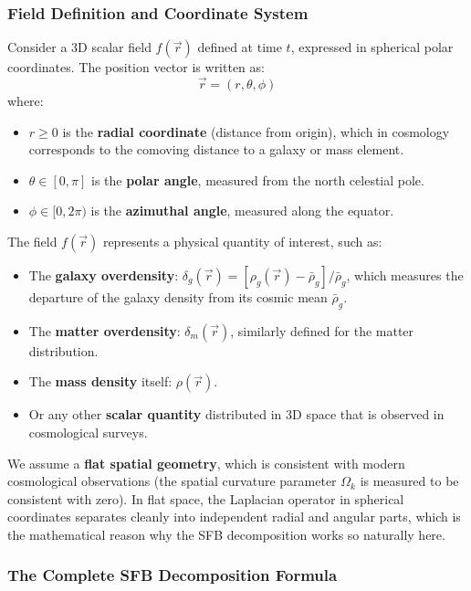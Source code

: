 \subsubsection{Field Definition and Coordinate System}

Consider a 3D scalar field $f(\vec{r})$ defined at time $t$, expressed in spherical polar coordinates. The position vector is written as:
\begin{equation}
\vec{r} = (r, \theta, \phi)
\end{equation}
where:
\begin{itemize}
    \item $r \geq 0$ is the \textbf{radial coordinate} (distance from origin), which in cosmology corresponds to the comoving distance to a galaxy or mass element.
    \item $\theta \in [0, \pi]$ is the \textbf{polar angle}, measured from the north celestial pole.
    \item $\phi \in [0, 2\pi)$ is the \textbf{azimuthal angle}, measured along the equator.
\end{itemize}

The field $f(\vec{r})$ represents a physical quantity of interest, such as:
\begin{itemize}
    \item The \textbf{galaxy overdensity}: $\delta_g(\vec{r}) = [\rho_g(\vec{r}) - \bar{\rho}_g]/\bar{\rho}_g$, which measures the departure of the galaxy density from its cosmic mean $\bar{\rho}_g$.
    \item The \textbf{matter overdensity}: $\delta_m(\vec{r})$, similarly defined for the matter distribution.
    \item The \textbf{mass density} itself: $\rho(\vec{r})$.
    \item Or any other \textbf{scalar quantity} distributed in 3D space that is observed in cosmological surveys.
\end{itemize}

We assume a \textbf{flat spatial geometry}, which is consistent with modern cosmological observations (the spatial curvature parameter $\Omega_k$ is measured to be consistent with zero). In flat space, the Laplacian operator in spherical coordinates separates cleanly into independent radial and angular parts, which is the mathematical reason why the SFB decomposition works so naturally here.

\subsubsection{The Complete SFB Decomposition Formula}

